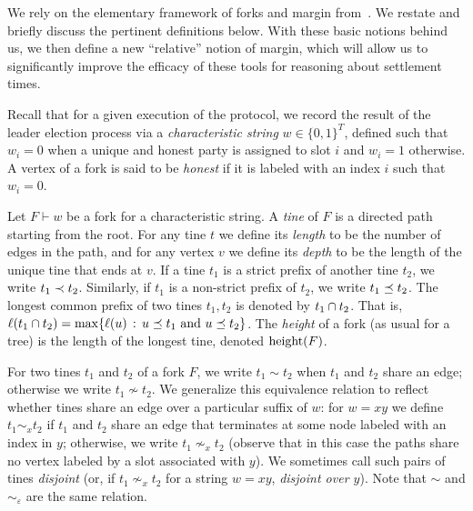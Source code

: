 We rely on the elementary framework of forks and margin
from~\citet{KRDO17}. We restate and briefly discuss the pertinent
definitions below. With these basic notions behind us, we then define
a new ``relative'' notion of margin, which will allow us to
significantly improve the efficacy of these tools for reasoning about
settlement times.

Recall that for a given execution of the protocol, we record the
result of the leader election process via a \emph{characteristic
  string} $w \in \{0,1\}^T$, defined such that $w_i = 0$ when a unique
and honest party is assigned to slot $i$ and $w_i = 1$ otherwise.
A vertex of a fork is said to be \emph{honest}
  if it is labeled with an index $i$ such that $w_i=0$.

\begin{definition}
  Let $F \vdash w$ be a fork for a characteristic string.  A
  \emph{tine} of $F$ is a directed path starting from the root. For
  any tine $t$ we define its \emph{length} to be the number of edges
  in the path, and for any vertex $v$ we define its \emph{depth} to be
  the length of the unique tine that ends at $v$. 
  If a tine $t_1$ is a strict prefix of another tine $t_2$, we write $t_1 \prec t_2$. 
  Similarly, if $t_1$ is a non-strict prefix of $t_2$, we write $t_1 \preceq t_2$.
  The longest common prefix of two tines $t_1, t_2$ is denoted by $t_1 \cap t_2$. 
  That is, $\ell(t_1 \cap t_2) = \max\{\ell(u) \, : \, \text{$u \preceq t_1$ and $u \preceq t_2$} \}$. 
  The \emph{height} of
  a fork (as usual for a tree) is the length of the longest tine,
  denoted $\operatorname{height}(F)$. 
\end{definition}

\begin{definition}
  For two tines $t_1$ and $t_2$ of a fork $F$, we write $t_1 \sim t_2$
  when $t_1$ and $t_2$ share an edge; otherwise we write
  $t_1 \nsim t_2$. We generalize this equivalence relation to reflect
  whether tines share an edge over a particular suffix of $w$: for
  $w = xy$ we define $t_1 \sim_x t_2$ if $t_1$ and $t_2$ share an edge
  that terminates at some node labeled with an index in $y$;
  otherwise, we write $t_1 \nsim_x t_2$ (observe that in this case the
  paths share no vertex labeled by a slot associated with $y$).  We
  sometimes call such pairs of tines \emph{disjoint} (or, if
  $t_1 \nsim_x t_2$ for a string $w = xy$, \emph{disjoint over
    $y$}). Note that $\sim$ and $\sim_\varepsilon$ are the same
  relation.
\end{definition}

